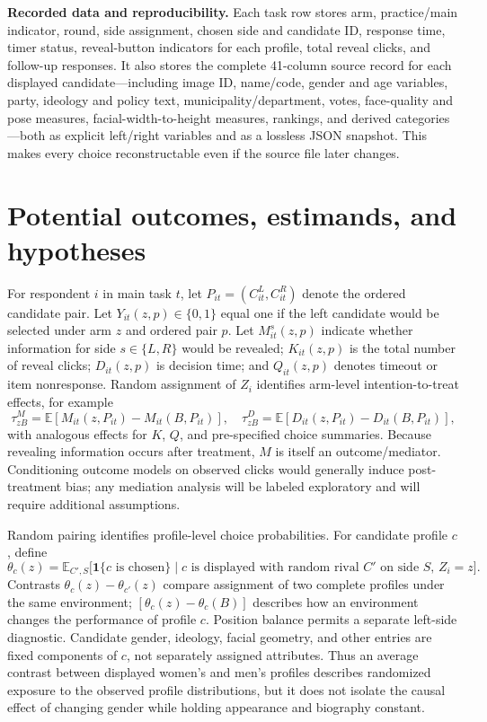 \documentclass[10pt]{article}
\newcommand{\E}{\mathbb{E}}
\begin{document}
\textbf{Recorded data and reproducibility.} Each task row stores arm, practice/main indicator, round, side assignment, chosen side and candidate ID, response time, timer status, reveal-button indicators for each profile, total reveal clicks, and follow-up responses. It also stores the complete 41-column source record for each displayed candidate---including image ID, name/code, gender and age variables, party, ideology and policy text, municipality/department, votes, face-quality and pose measures, facial-width-to-height measures, rankings, and derived categories---both as explicit left/right variables and as a lossless JSON snapshot. This makes every choice reconstructable even if the source file later changes.

\section{Potential outcomes, estimands, and hypotheses}

For respondent $i$ in main task $t$, let $P_{it}=(C^L_{it},C^R_{it})$ denote the ordered candidate pair. Let $Y_{it}(z,p)\in\{0,1\}$ equal one if the left candidate would be selected under arm $z$ and ordered pair $p$. Let $M^s_{it}(z,p)$ indicate whether information for side $s\in\{L,R\}$ would be revealed; $K_{it}(z,p)$ is the total number of reveal clicks; $D_{it}(z,p)$ is decision time; and $Q_{it}(z,p)$ denotes timeout or item nonresponse. Random assignment of $Z_i$ identifies arm-level intention-to-treat effects, for example
\[
\tau^{M}_{zB}=\E\!\left[M_{it}(z,P_{it})-M_{it}(B,P_{it})\right],\quad
\tau^{D}_{zB}=\E\!\left[D_{it}(z,P_{it})-D_{it}(B,P_{it})\right],
\]
with analogous effects for $K$, $Q$, and pre-specified choice summaries. Because revealing information occurs after treatment, $M$ is itself an outcome/mediator. Conditioning outcome models on observed clicks would generally induce post-treatment bias; any mediation analysis will be labeled exploratory and will require additional assumptions.

Random pairing identifies profile-level choice probabilities. For candidate profile $c$, define
\[
\theta_c(z)=\E_{C',S}\bigl[\mathbf 1\{c\text{ is chosen}\}\mid c\text{ is displayed with random rival }C'\text{ on side }S,\,Z_i=z\bigr].
\]
Contrasts $\theta_c(z)-\theta_{c'}(z)$ compare assignment of two complete profiles under the same environment; $[\theta_c(z)-\theta_c(B)]$ describes how an environment changes the performance of profile $c$. Position balance permits a separate left-side diagnostic. Candidate gender, ideology, facial geometry, and other entries are fixed components of $c$, not separately assigned attributes. Thus an average contrast between displayed women's and men's profiles describes randomized exposure to the observed profile distributions, but it does not isolate the causal effect of changing gender while holding appearance and biography constant.
\end{document}

